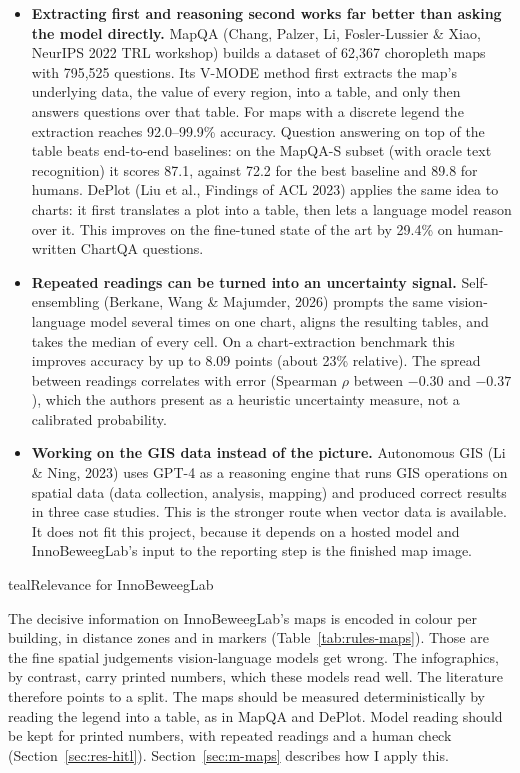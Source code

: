\begin{itemize}
\item \textbf{Extracting first and reasoning second works far better than asking the model directly.} MapQA (Chang, Palzer, Li, Fosler-Lussier \& Xiao, NeurIPS 2022 TRL workshop) builds a dataset of 62,367 choropleth maps with 795,525 questions. Its V-MODE method first extracts the map's underlying data, the value of every region, into a table, and only then answers questions over that table. For maps with a discrete legend the extraction reaches 92.0--99.9\% accuracy. Question answering on top of the table beats end-to-end baselines: on the MapQA-S subset (with oracle text recognition) it scores 87.1, against 72.2 for the best baseline and 89.8 for humans. DePlot (Liu et al., Findings of ACL 2023) applies the same idea to charts: it first translates a plot into a table, then lets a language model reason over it. This improves on the fine-tuned state of the art by 29.4\% on human-written ChartQA questions.
\item \textbf{Repeated readings can be turned into an uncertainty signal.} Self-ensembling (Berkane, Wang \& Majumder, 2026) prompts the same vision-language model several times on one chart, aligns the resulting tables, and takes the median of every cell. On a chart-extraction benchmark this improves accuracy by up to 8.09 points (about 23\% relative). The spread between readings correlates with error (Spearman $\rho$ between $-0.30$ and $-0.37$), which the authors present as a heuristic uncertainty measure, not a calibrated probability.
\item \textbf{Working on the GIS data instead of the picture.} Autonomous GIS (Li \& Ning, 2023) uses GPT-4 as a reasoning engine that runs GIS operations on spatial data (data collection, analysis, mapping) and produced correct results in three case studies. This is the stronger route when vector data is available. It does not fit this project, because it depends on a hosted model and InnoBeweegLab's input to the reporting step is the finished map image.
\end{itemize}

\begin{calloutbox}{teal}{Relevance for InnoBeweegLab}

The decisive information on InnoBeweegLab's maps is encoded in colour per building, in distance zones and in markers (Table~\ref{tab:rules-maps}). Those are the fine spatial judgements vision-language models get wrong. The infographics, by contrast, carry printed numbers, which these models read well. The literature therefore points to a split. The maps should be measured deterministically by reading the legend into a table, as in MapQA and DePlot. Model reading should be kept for printed numbers, with repeated readings and a human check (Section~\ref{sec:res-hitl}). Section~\ref{sec:m-maps} describes how I apply this.

\end{calloutbox}
